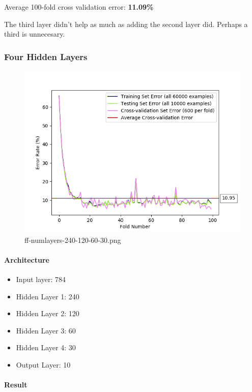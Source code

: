 \documentclass[11pt]{article}
\makeatletter
\def\maxwidth{\ifdim\Gin@nat@width>\linewidth\linewidth
    \else\Gin@nat@width\fi}
\let\Oldincludegraphics\includegraphics
\renewcommand{\includegraphics}[1]{\Oldincludegraphics[width=.8\maxwidth]{#1}}
\providecommand{\tightlist}{%
      \setlength{\itemsep}{0pt}\setlength{\parskip}{0pt}}
\makeatother
\begin{document}
Average 100-fold cross validation error: \textbf{11.09\%}

The third layer didn't help as much as adding the second layer did.
Perhaps a third is unnecesary.

\pagebreak

\subsubsection{Four Hidden Layers}\label{four-hidden-layers}

\begin{figure}[htbp]
\centering
\includegraphics{plots/ff-numlayers-240-120-60-30.png}
\caption{ff-numlayers-240-120-60-30.png}
\end{figure}

\paragraph{Architecture}\label{architecture-4}

\begin{itemize}
\tightlist
\item
  Input layer: 784
\item
  Hidden Layer 1: 240
\item
  Hidden Layer 2: 120
\item
  Hidden Layer 3: 60
\item
  Hidden Layer 4: 30
\item
  Output Layer: 10
\end{itemize}

\paragraph{Result}\label{result-3}
\end{document}
